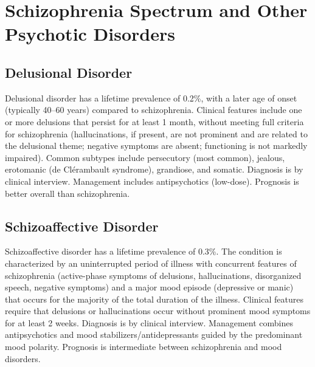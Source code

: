 \section{Schizophrenia Spectrum and Other Psychotic Disorders}








\label{sec:Schizophrenia Spectrum and Other Psychotic Disorders}

\subsection{Delusional Disorder}
\label{sec:Delusional Disorder}
Delusional disorder has a lifetime prevalence of 0.2\%, with a later age of onset (typically 40--60 years) compared to schizophrenia. Clinical features include one or more delusions that persist for at least 1 month, without meeting full criteria for schizophrenia (hallucinations, if present, are not prominent and are related to the delusional theme; negative symptoms are absent; functioning is not markedly impaired). Common subtypes include persecutory (most common), jealous, erotomanic (de Clérambault syndrome), grandiose, and somatic. Diagnosis is by clinical interview. Management includes antipsychotics (low-dose). Prognosis is better overall than schizophrenia.

\subsection{Schizoaffective Disorder}
\label{sec:Schizoaffective Disorder}
Schizoaffective disorder has a lifetime prevalence of 0.3\%. The condition is characterized by an uninterrupted period of illness with concurrent features of schizophrenia (active-phase symptoms of delusions, hallucinations, disorganized speech, negative symptoms) and a major mood episode (depressive or manic) that occurs for the majority of the total duration of the illness. Clinical features require that delusions or hallucinations occur without prominent mood symptoms for at least 2 weeks. Diagnosis is by clinical interview. Management combines antipsychotics and mood stabilizers/antidepressants guided by the predominant mood polarity. Prognosis is intermediate between schizophrenia and mood disorders.

